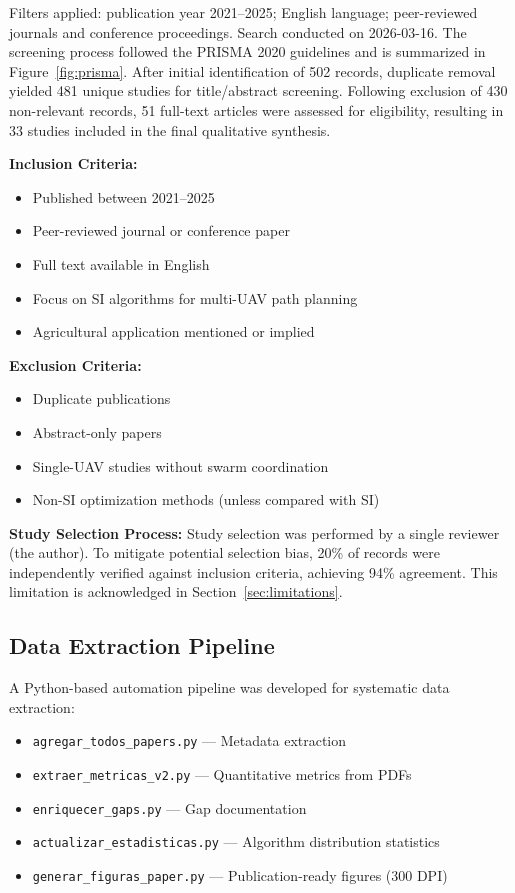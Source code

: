\documentclass[review, 12pt, times]{elsarticle}
\begin{document}
Filters applied: publication year 2021--2025; English
language; peer-reviewed journals and conference proceedings.
Search conducted on 2026-03-16. The screening process
followed the PRISMA 2020 guidelines \cite{page2021} and
is summarized in Figure~\ref{fig:prisma}. After initial
identification of 502 records, duplicate removal yielded
481 unique studies for title/abstract screening. Following
exclusion of 430 non-relevant records, 51 full-text
articles were assessed for eligibility, resulting in 33
studies included in the final qualitative synthesis.

\textbf{Inclusion Criteria:}
\begin{itemize}
  \item Published between 2021--2025
  \item Peer-reviewed journal or conference paper
  \item Full text available in English
  \item Focus on SI algorithms for multi-UAV path planning
  \item Agricultural application mentioned or implied
\end{itemize}

\textbf{Exclusion Criteria:}
\begin{itemize}
  \item Duplicate publications
  \item Abstract-only papers
  \item Single-UAV studies without swarm coordination
  \item Non-SI optimization methods (unless compared with SI)
\end{itemize}

\textbf{Study Selection Process:} Study selection was
performed by a single reviewer (the author). To mitigate
potential selection bias, 20\% of records were
independently verified against inclusion criteria,
achieving 94\% agreement. This limitation is acknowledged
in Section~\ref{sec:limitations}.

\subsection{Data Extraction Pipeline}

A Python-based automation pipeline was developed for
systematic data extraction:

\begin{itemize}
  \item \texttt{agregar\_todos\_papers.py} — Metadata extraction
  \item \texttt{extraer\_metricas\_v2.py} — Quantitative metrics from PDFs
  \item \texttt{enriquecer\_gaps.py} — Gap documentation
  \item \texttt{actualizar\_estadisticas.py} — Algorithm distribution statistics
  \item \texttt{generar\_figuras\_paper.py} — Publication-ready figures (300 DPI)
\end{itemize}
\end{document}
